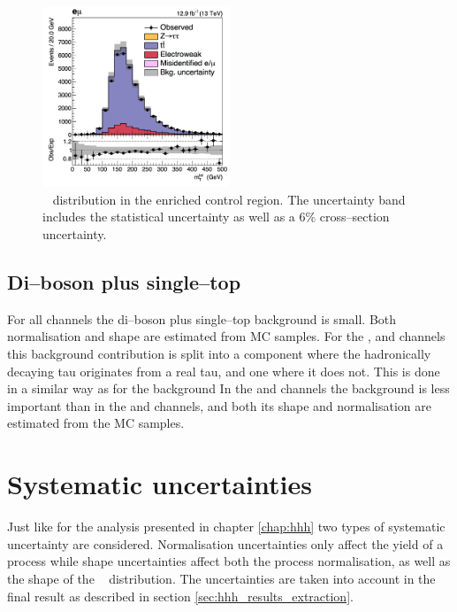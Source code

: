 \begin{figure}[h!]
\begin{center}
\includegraphics[width=0.5\textwidth]{./MSSM/Figures/mt_tot_ttcontrol_em_2016.png}
\end{center}
\caption{\mTtot~ distribution in the \ttbar enriched control region.
The uncertainty band includes the statistical uncertainty as well as a 6\% \ttbar cross--section uncertainty.}
\label{fig:mssm_corrs_toppt}
\end{figure}


\subsection{Di--boson plus single--top}
\label{sec:mssm_bkgs_other}
For all channels the di--boson plus 
single--top background is small.
Both normalisation and shape are estimated from \ac{MC}
samples. For the \etau, \mutau and \tautau channels
this background contribution is split into a component
where the hadronically decaying tau originates from a real
tau, and one where it does not. This is done in a similar
way as for the \ttbar background
In the \tautau and \emu channels the \Wjets background
is less important than in the \etau and \mutau channels, and both
its shape and normalisation are estimated from the
\ac{MC} samples.


\section{Systematic uncertainties}
\label{sec:mssm_uncs}
Just like for the analysis presented in chapter \ref{chap:hhh}
two types of systematic uncertainty are considered. Normalisation
uncertainties only affect the yield of a process while shape
uncertainties affect both the process normalisation, as well as the shape
of the \mTtot~ distribution. The uncertainties are taken into account 
in the final result as described in section \ref{sec:hhh_results_extraction}.

